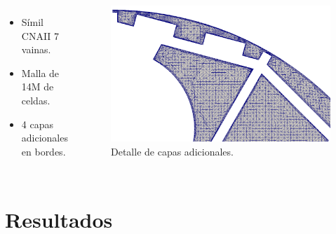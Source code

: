 \documentclass[9pt,mathserif]{beamer}
\begin{document}
{\begin{columns}
    \begin{minipage}[c][0.4\textheight][c]{\linewidth}
      \begin{itemize}
      \item Símil CNAII 7 vainas.
      \item Malla de 14M de celdas.
      \item 4 capas adicionales en bordes.
      \end{itemize}
    \end{minipage}
    
    \begin{minipage}[c][0.5\textheight][c]{\linewidth}
      \begin{figure}
        \hspace{-1.5cm}   
        \includegraphics[width=0.95\linewidth]{figsATUCHA/atucha_mesh3a.png} \vspace{-3mm}
        \caption{Detalle de capas adicionales.}
        \end{figure}
    \end{minipage}
  \end{columns}

}



\section{Resultados}
\end{document}
